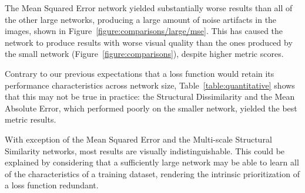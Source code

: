 The Mean Squared Error network yielded substantially worse results than all of the other large networks, producing a large amount of noise artifacts in the images, shown in Figure~\ref{figure:comparisons/large/mse}. This has caused the network to produce results with worse visual quality than the ones produced by the small network (Figure~\ref{figure:comparisons}), despite higher metric scores.

Contrary to our previous expectations that a loss function would retain its performance characteristics across network size, Table~\ref{table:quantitative} shows that this may not be true in practice: the Structural Dissimilarity and the Mean Absolute Error, which performed poorly on the smaller network, yielded the best metric results.

With exception of the Mean Squared Error and the Multi-scale Structural Similarity networks, most results are visually indistinguishable. This could be explained by considering that a sufficiently large network may be able to learn all of the characteristics of a training dataset, rendering the intrinsic prioritization of a loss function redundant.
